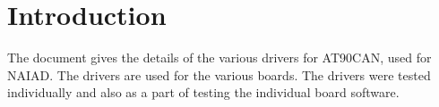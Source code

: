 \section{Introduction}\label{sec:introduction}
The document gives the details of the various drivers for AT90CAN, used for NAIAD. The drivers are used for the various boards. The drivers were tested individually and also as a part of testing the individual board software.
